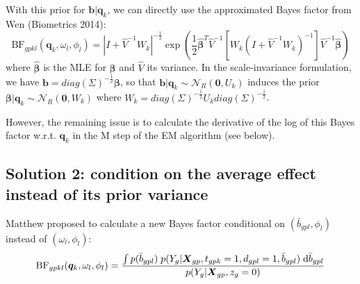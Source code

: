 \documentclass[10pt]{article}
\newcommand{\Norm}{{\mathcal{N}}} %
\newcommand{\BF}{{\text{BF}}} %
\newcommand{\der}{{\text{d}}} %
\newcommand{\Xv}{\mbox{\boldmath$X$}}
\begin{document}
With this prior for $\bm{b}|\bm{q}_k$, we can directly use the approximated Bayes factor from Wen (Biometrics 2014):
\begin{equation}
  \label{abf_gpkl_wen}
  \BF_{gpkl}(\bm{q}_k, \omega_l,\phi_l) = |I + \hat{V}^{-1} W_k|^{-\frac{1}{2}} \exp \left( \frac{1}{2} \hat{\bm{\beta}}^T \hat{V}^{-1} \left[ W_k (I + \hat{V}^{-1} W_k)^{-1} \right] \hat{V}^{-1} \hat{\bm{\beta}} \right)
\end{equation}
where $\hat{\bm{\beta}}$ is the MLE for $\bm{\beta}$ and $\hat{V}$ its variance.
In the scale-invariance formulation, we have $\bm{b} = diag(\Sigma)^{-\frac{1}{2}} \bm{\beta}$, so that $\bm{b}|\bm{q}_k \sim \Norm_R(\bm{0}, U_k)$ induces the prior $\bm{\beta}|\bm{q}_k \sim \Norm_R(\bm{0}, W_k)$ where $W_k = diag(\Sigma)^{-\frac{1}{2}} U_k diag(\Sigma)^{-\frac{1}{2}}$.

However, the remaining issue is to calculate the derivative of the log of this Bayes factor w.r.t. $\bm{q}_k$ in the M step of the EM algorithm (see below).


\subsection{Solution 2: condition on the average effect instead of its prior variance}

Matthew proposed to calculate a new Bayes factor conditional on $(\bar{b}_{gpl},\phi_l)$ instead of $(\omega_l,\phi_l)$:
\begin{equation}
  \begin{aligned}
    \BF_{gpkl}(\bm{q}_k, \omega_l, \phi_l) &= \frac{\int p(\bar{b}_{gpl}) \; p(Y_g | \Xv_{gp}, t_{gpk}=1, d_{gpl}=1, \bar{b}_{gpl}) \; \der \bar{b}_{gpl}}{p(Y_g | \Xv_{gp}, z_g=0)} \\
  \end{aligned}
\end{equation}
\end{document}
